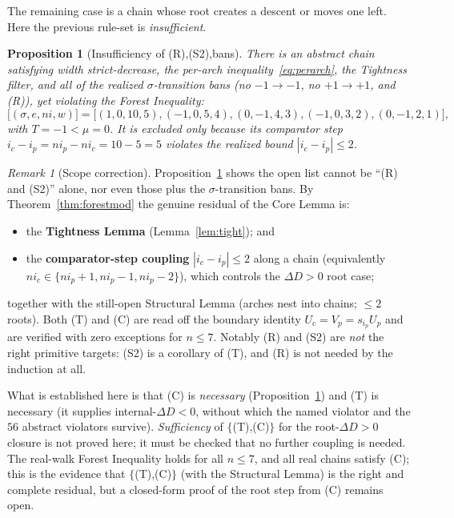 \documentclass[11pt]{article}
\theoremstyle{plain}
\newtheorem{proposition}[theorem]{Proposition}
\theoremstyle{definition}
\theoremstyle{remark}
\newtheorem{remark}[theorem]{Remark}
\newcommand{\dD}{\Delta D}
\begin{document}
The remaining case is a chain whose root creates a descent or moves one left. Here the
previous rule-set is \emph{insufficient}.

\begin{proposition}[Insufficiency of (R),(S2),bans]\label{prop:counter}
There is an abstract chain satisfying width strict-decrease, the per-arch
inequality~\eqref{eq:perarch}, the Tightness filter, and \emph{all} of the realized
$\sigma$-transition bans \textnormal{(}no $-1\to-1$, no $+1\to+1$, and \textnormal{(R)}\textnormal{)},
yet violating the Forest Inequality:
\[
\big[(\sigma,e,ni,w)\big]=\big[(1,0,10,5),(-1,0,5,4),(0,-1,4,3),(-1,0,3,2),(0,-1,2,1)\big],
\]
with $T=-1<\mu=0$. It is excluded only because its comparator step
$i_c-i_p=ni_p-ni_c=10-5=5$ violates the realized bound $|i_c-i_p|\le2$.
\end{proposition}

\begin{remark}[Scope correction]\label{rmk:scope}
Proposition~\ref{prop:counter} shows the open list cannot be ``(R) and (S2)'' alone, nor
even those plus the $\sigma$-transition bans. By Theorem~\ref{thm:forestmod} the genuine
residual of the Core Lemma is:
\begin{itemize}
\item[\textbf{(T)}] the \textbf{Tightness Lemma} (Lemma~\ref{lem:tight}); and
\item[\textbf{(C)}] the \textbf{comparator-step coupling} $|i_c-i_p|\le2$ along a chain
(equivalently $ni_c\in\{ni_p+1,ni_p-1,ni_p-2\}$), which controls the $\dD>0$ root case;
\end{itemize}
together with the still-open Structural Lemma (arches nest into chains; $\le2$ roots). Both
(T) and (C) are read off the boundary identity $U_c=V_p=s_{i_p}U_p$ and are verified with
zero exceptions for $n\le7$. Notably (R) and (S2) are \emph{not} the right primitive
targets: (S2) is a corollary of (T), and (R) is not needed by the induction at all.

What is established here is that (C) is \emph{necessary} (Proposition~\ref{prop:counter})
and (T) is necessary (it supplies internal-$\dD<0$, without which the named violator and
the $56$ abstract violators survive). \emph{Sufficiency} of $\{$(T),(C)$\}$ for the
root-$\dD>0$ closure is not proved here; it must be checked that no further coupling is
needed. The real-walk Forest Inequality holds for all $n\le7$, and all real chains satisfy
(C); this is the evidence that $\{$(T),(C)$\}$ (with the Structural Lemma) is the right and
complete residual, but a closed-form proof of the root step from (C) remains open.
\end{remark}
\end{document}
